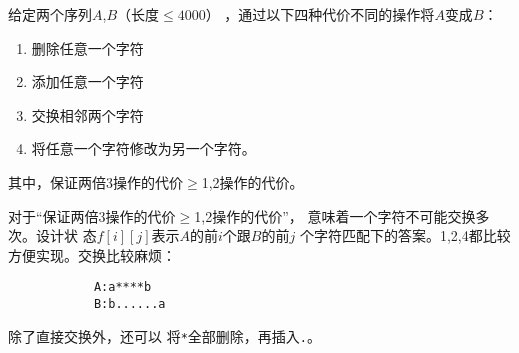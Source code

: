 \begin{prob}
	给定两个序列$A$,$B$（长度$\le 4000$）
	，通过以下四种代价不同的操作将$A$变成$B$：
	\begin{enumerate}
		\item 删除任意一个字符
		\item 添加任意一个字符
		\item 交换相邻两个字符
		\item 将任意一个字符修改为另一个字符。
	\end{enumerate}
	其中，保证两倍3操作的代价$\ge$1,2操作的代价。
\end{prob}

\begin{sol}
	对于“保证两倍3操作的代价$\ge$1,2操作的代价”，
	意味着一个字符不可能交换多次。设计状
	态$f[i][j]$表示$A$的前$i$个跟$B$的前$j$
	个字符匹配下的答案。1,2,4都比较方便实现。交换比较麻烦：
	\begin{verbatim}
	        A:a****b
	        B:b......a
	\end{verbatim}
	除了直接交换外，还可以
	将\texttt{*}全部删除，再插入\texttt{.}。
\end{sol}
